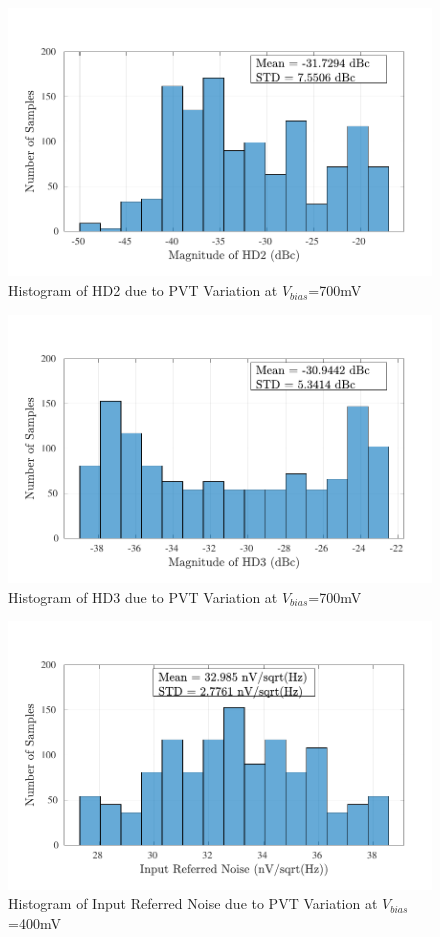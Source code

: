 \begin{figure} [H]
\centering
\includegraphics[scale=1]{Figures/Corners/Overall/PVT_Max/PDFs/PVT_Max_hd2.pdf}
\caption{Histogram of HD2 due to PVT Variation at $V_{bias}$=700mV}
\end{figure}

\begin{figure} [H]
\centering
\includegraphics[scale=1]{Figures/Corners/Overall/PVT_Max/PDFs/PVT_Max_hd3.pdf}
\caption{Histogram of HD3 due to PVT Variation at $V_{bias}$=700mV}
\end{figure}

\begin{figure} [H]
\centering
\includegraphics[scale=1]{Figures/Corners/Overall/PVT_Max/PDFs/PVT_Max_irn.pdf}
\caption{Histogram of Input Referred Noise due to PVT Variation at $V_{bias}$=400mV}
\end{figure}

